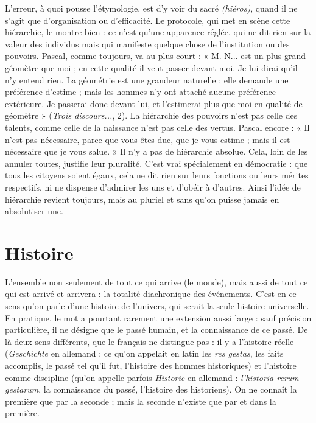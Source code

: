 L'erreur, à quoi pousse l’étymologie, est d’y voir du sacré {\it (hiéros)}, quand il ne
s’agit que d'organisation ou d'efficacité. Le protocole, qui met en scène cette
hiérarchie, le montre bien : ce n’est qu’une apparence réglée, qui ne dit rien sur
la valeur des individus mais qui manifeste quelque chose de l'institution ou des
pouvoirs. Pascal, comme toujours, va au plus court : « M. N... est un plus
grand géomètre que moi ; en cette qualité il veut passer devant moi. Je lui dirai
qu'il n’y entend rien. La géométrie est une grandeur naturelle ; elle demande
une préférence d’estime ; mais les hommes n’y ont attaché aucune préférence
extérieure. Je passerai donc devant lui, et l’estimerai plus que moi en qualité de
géomètre » ({\it Trois discours...}, 2). La hiérarchie des pouvoirs n’est pas celle des
talents, comme celle de la naissance n’est pas celle des vertus. Pascal encore :
« Il n’est pas nécessaire, parce que vous êtes duc, que je vous estime ; mais il est
nécessaire que je vous salue. » Il n’y a pas de hiérarchie absolue. Cela, loin de
les annuler toutes, justifie leur pluralité. C’est vrai spécialement en démocratie :
que tous les citoyens soient égaux, cela ne dit rien sur leurs fonctions ou leurs
mérites respectifs, ni ne dispense d’admirer les uns et d’obéir à d’autres. Ainsi
l’idée de hiérarchie revient toujours, mais au pluriel et sans qu’on puisse jamais
en absolutiser une.

\section{Histoire}
L'ensemble non seulement de tout ce qui arrive (le monde),
mais aussi de tout ce qui est arrivé et arrivera : la totalité diachronique
des événements. C’est en ce sens qu’on parle d’une histoire de l’univers,
qui serait la seule histoire universelle. En pratique, le mot a pourtant rarement
une extension aussi large : sauf précision particulière, il ne désigne que le
passé humain, et la connaissance de ce passé. De là deux sens différents, que le
français ne distingue pas : il y a l’histoire réelle ({\it Geschichte} en allemand : ce
qu'on appelait en latin les {\it res gestas}, les faits accomplis, le passé tel qu’il fut,
l’histoire des hommes historiques) et l’histoire comme discipline (qu’on appelle
parfois {\it Historie} en allemand : {\it l’historia rerum gestarum}, la connaissance du
passé, l’histoire des historiens). On ne connaît la première que par la seconde ;
mais la seconde n’existe que par et dans la première.

